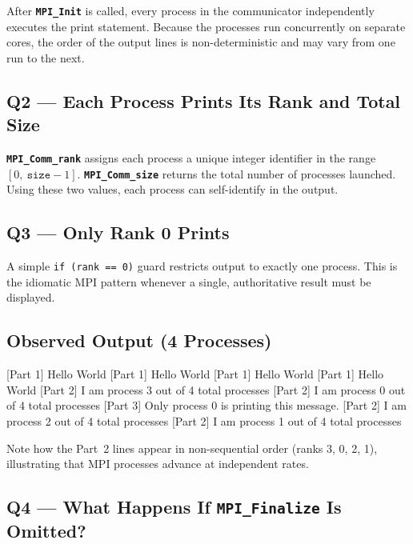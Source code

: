 \documentclass[12pt,a4paper]{article}
\newcommand{\mpiname}[1]{\texttt{\textbf{#1}}}
\begin{document}
After \mpiname{MPI\_Init} is called, every process in the communicator
independently executes the print statement.
Because the processes run concurrently on separate cores, the order of the
output lines is non-deterministic and may vary from one run to the next.

\subsection{Q2 — Each Process Prints Its Rank and Total Size}

\mpiname{MPI\_Comm\_rank} assigns each process a unique integer identifier
in the range $[0,\ \texttt{size}-1]$.
\mpiname{MPI\_Comm\_size} returns the total number of processes launched.
Using these two values, each process can self-identify in the output.

\subsection{Q3 — Only Rank 0 Prints}

A simple \texttt{if (rank == 0)} guard restricts output to exactly one
process.
This is the idiomatic MPI pattern whenever a single, authoritative result
must be displayed.

\subsection{Observed Output (4 Processes)}

\begin{outputbox}[]
{[}Part 1{]} Hello World
{[}Part 1{]} Hello World
{[}Part 1{]} Hello World
{[}Part 1{]} Hello World
{[}Part 2{]} I am process 3 out of 4 total processes
{[}Part 2{]} I am process 0 out of 4 total processes
{[}Part 3{]} Only process 0 is printing this message.
{[}Part 2{]} I am process 2 out of 4 total processes
{[}Part 2{]} I am process 1 out of 4 total processes
\end{outputbox}

Note how the Part~2 lines appear in non-sequential order
(ranks 3, 0, 2, 1), illustrating that MPI processes advance at
independent rates.

\subsection{Q4 — What Happens If \texttt{MPI\_Finalize} Is Omitted?}
\end{document}
